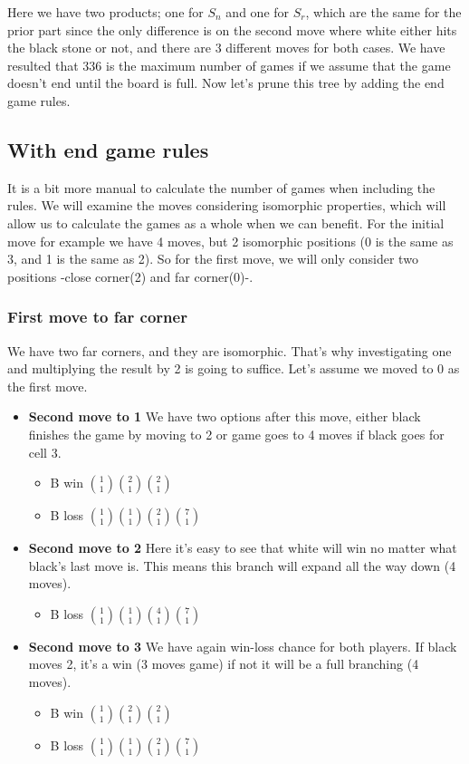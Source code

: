Here we have two products; one for $S_n$ and one for $S_r$, which are the same for the prior part since the only difference is on the second move where white either hits the black stone or not, and there are 3 different moves for both cases. We have resulted that 336 is the maximum number of games if we assume that the game doesn't end until the board is full. Now let's prune this tree by adding the end game rules.

\subsection{With end game rules}

It is a bit more manual to calculate the number of games when including the rules. We will examine the moves considering isomorphic properties, which will allow us to calculate the games as a whole when we can benefit. For the initial move for example we have 4 moves, but 2 isomorphic positions (0 is the same as 3, and 1 is the same as 2). So for the first move, we will only consider two positions -close corner(2) and far corner(0)-.

\subsubsection{First move to far corner}

We have two far corners, and they are isomorphic. That's why investigating one and multiplying the result by 2 is going to suffice.
Let's assume we moved to 0 as the first move.

\begin{itemize}
    \item \textbf{Second move to 1} We have two options after this move, either black finishes the game by moving to 2 or game goes to 4 moves if black goes for cell 3.
    \begin{itemize}
        \item B win ${1 \choose 1}{2 \choose 1}{2 \choose 1}$
        \item B loss ${1 \choose 1}{1 \choose 1}{2 \choose 1}{7 \choose 1}$
    \end{itemize}
    \item \textbf{Second move to 2} Here it's easy to see that white will win no matter what black's last move is. This means this branch will expand all the way down (4 moves).
    \begin{itemize}
        \item B loss ${1 \choose 1}{1 \choose 1}{4 \choose 1}{7 \choose 1}$
    \end{itemize}
    \item \textbf{Second move to 3} We have again win-loss chance for both players. If black moves 2, it's a win (3 moves game) if not it will be a full branching (4 moves).
    \begin{itemize}
        \item B win   ${1 \choose 1}{2 \choose 1}{2 \choose 1}$
        \item B loss ${1 \choose 1}{1 \choose 1}{2 \choose 1}{7 \choose 1}$
    \end{itemize}
\end{itemize}

